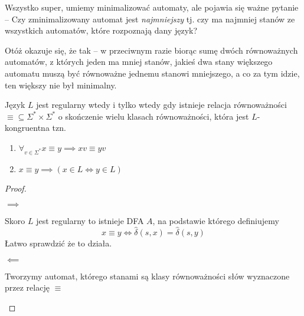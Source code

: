Wszystko super, umiemy minimalizować automaty, ale pojawia się ważne pytanie -- Czy zminimalizowany automat jest \textit{najmniejszy} tj. czy ma najmniej stanów ze wszystkich automatów, które rozpoznają dany język?

Otóż okazuje się, że tak -- w przeciwnym razie biorąc sumę dwóch równoważnych automatów, z których jeden ma mniej stanów, jakieś dwa stany większego automatu muszą być równoważne jednemu stanowi mniejszego, a co za tym idzie, ten większy nie był minimalny.

\begin{theorem}
    Język \( L \) jest regularny wtedy i tylko wtedy gdy
    istnieje relacja równoważności \( \equiv \subseteq \Sigma^* \times \Sigma^*\) o skończenie wielu klasach równoważności, która jest \(L\)-kongruentna tzn.
    \begin{enumerate}
        \item \(\forall_{v \in \Sigma^*} x \equiv y \implies xv \equiv yv \)
        \item \( x \equiv y \implies (x \in L \iff y \in L)\)
    \end{enumerate}
\end{theorem}
\begin{proof} \( \)
    \begin{description}
        \item \( \implies \)
        
        Skoro \( L \) jest regularny to istnieje DFA \( A \), na podstawie którego definiujemy
        \[
            x \equiv y \iff \hat \delta(s, x) = \hat \delta(s, y)
        \]
        Łatwo sprawdzić że to działa.
        
        \item \( \impliedby \)
        
        Tworzymy automat, którego stanami są klasy równoważności słów wyznaczone przez relację \( \equiv \)
    \end{description}
\end{proof}